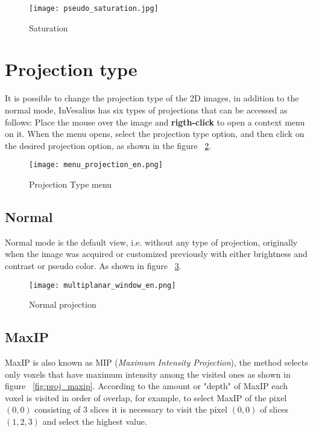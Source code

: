 \begin{figure}[H]
\centering
\texttt{[image: pseudo\_saturation.jpg]}
\caption{Saturation}
\label{fig:image_saturation}
\end{figure}

\newpage

\section{Projection type}

It is possible to change the projection type of the 2D images, in addition to the normal mode, InVesalius has six types of projections that can be accessed as follows: Place the mouse over the image and \textbf{rigth-click} to open a context menu on it. When the menu opens, select the projection type option, and then click on the desired projection option, as shown in the figure ~\ref{fig:menu_proj}.

\begin{figure}[H]
\centering
\texttt{[image: menu\_projection\_en.png]}
\caption{Projection Type menu}
\label{fig:menu_proj}
\end{figure}

\subsection{Normal}

Normal mode is the default view, i.e. without any type of projection, originally when the image was acquired or customized previously with either brightness and contrast or pseudo color. As shown in figure ~\ref{fig:proj_normal}.

\begin{figure}[H]
\centering
\texttt{[image: multiplanar\_window\_en.png]}
\caption{Normal projection}
\label{fig:proj_normal}
\end{figure}

\subsection{MaxIP}
\label{sec:max_ip}
MaxIP is also known as MIP (\textit{Maximum Intensity Projection}), the method selects only voxels that have maximum intensity among the visited ones as shown in figure ~\ref{fig:proj_maxip}. According to the amount or "depth" of MaxIP each voxel is visited in order of overlap, for example, to select MaxIP of the pixel $(0,0)$ consisting of 3 slices it is necessary to visit the pixel $(0,0)$ of slices $(1,2,3)$ and select the highest value.


